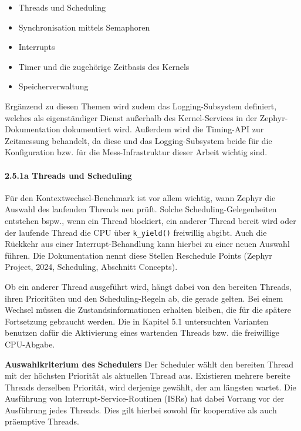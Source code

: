 \begin{itemize}
\item Threads und Scheduling
\item Synchronisation mittels Semaphoren
\item Interrupts
\item Timer und die zugeh{\"o}rige Zeitbasis des Kernels
\item Speicherverwaltung
\end{itemize}
Erg{\"a}nzend zu diesen Themen wird zudem das Logging-Subsystem definiert, welches als eigenst{\"a}ndiger Dienst au{\ss}erhalb des Kernel-Services in der Zephyr-Dokumentation dokumentiert wird. Au{\ss}erdem wird die Timing-API zur Zeitmessung behandelt, da diese und das Logging-Subsystem beide f{\"u}r die Konfiguration bzw. f{\"u}r die Mess-Infrastruktur dieser Arbeit wichtig sind.

\paragraph*{\textbf{2.5.1a Threads und Scheduling}}
F{\"u}r den Kontextwechsel-Benchmark ist vor allem wichtig, wann Zephyr die Auswahl des laufenden Threads neu pr{\"u}ft. Solche Scheduling-Gelegenheiten entstehen bspw., wenn ein Thread blockiert, ein anderer Thread bereit wird oder der laufende Thread die CPU {\"u}ber \lstinline[style=fileinline]|k_yield()| freiwillig abgibt. Auch die R{\"u}ckkehr aus einer Interrupt-Behandlung kann hierbei zu einer neuen Auswahl f{\"u}hren. Die Dokumentation nennt diese Stellen Reschedule Points (Zephyr Project, 2024, \glqq{}Scheduling\grqq{}, Abschnitt \glqq{}Concepts\grqq{}).

Ob ein anderer Thread ausgef{\"u}hrt wird, h{\"a}ngt dabei von den bereiten Threads, ihren Priorit{\"a}ten und den Scheduling-Regeln ab, die gerade gelten. Bei einem Wechsel m{\"u}ssen die Zustandsinformationen erhalten bleiben, die f{\"u}r die sp{\"a}tere Fortsetzung gebraucht werden. Die in Kapitel 5.1 untersuchten Varianten benutzen daf{\"u}r die Aktivierung eines wartenden Threads bzw. die freiwillige CPU-Abgabe.

\textbf{Auswahlkriterium des} \textbf{Schedulers} Der Scheduler w{\"a}hlt den bereiten Thread mit der h{\"o}chsten Priorit{\"a}t als aktuellen Thread aus. Existieren mehrere bereite Threads derselben Priorit{\"a}t, wird derjenige gew{\"a}hlt, der am l{\"a}ngsten wartet. Die Ausf{\"u}hrung von Interrupt-Service-Routinen (ISRs) hat dabei Vorrang vor der Ausf{\"u}hrung jedes Threads. Dies gilt hierbei sowohl f{\"u}r kooperative als auch pr{\"a}emptive Threads.


